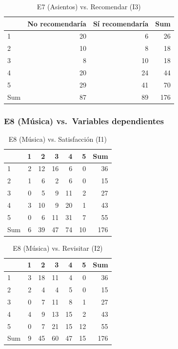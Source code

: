 \documentclass[
  spanish,
]{article}
\begin{document}
\begin{longtable}[t]{lrrr}
\caption{\label{tab:cont-e7-recom}E7 (Asientos) vs. Recomendar (I3)}\\
\toprule
 & No recomendaría & Sí recomendaría & Sum\\
\midrule
1 & 20 & 6 & 26\\
2 & 10 & 8 & 18\\
3 & 8 & 10 & 18\\
4 & 20 & 24 & 44\\
5 & 29 & 41 & 70\\
\addlinespace
Sum & 87 & 89 & 176\\
\bottomrule
\end{longtable}

\subsubsection{E8 (Música) vs.~Variables
dependientes}\label{e8-muxfasica-vs.-variables-dependientes}

\begin{longtable}[t]{lrrrrrr}
\caption{\label{tab:cont-e8-satisf}E8 (Música) vs. Satisfacción (I1)}\\
\toprule
 & 1 & 2 & 3 & 4 & 5 & Sum\\
\midrule
1 & 2 & 12 & 16 & 6 & 0 & 36\\
2 & 1 & 6 & 2 & 6 & 0 & 15\\
3 & 0 & 5 & 9 & 11 & 2 & 27\\
4 & 3 & 10 & 9 & 20 & 1 & 43\\
5 & 0 & 6 & 11 & 31 & 7 & 55\\
\addlinespace
Sum & 6 & 39 & 47 & 74 & 10 & 176\\
\bottomrule
\end{longtable}

\begin{longtable}[t]{lrrrrrr}
\caption{\label{tab:cont-e8-revis}E8 (Música) vs. Revisitar (I2)}\\
\toprule
 & 1 & 2 & 3 & 4 & 5 & Sum\\
\midrule
1 & 3 & 18 & 11 & 4 & 0 & 36\\
2 & 2 & 4 & 4 & 5 & 0 & 15\\
3 & 0 & 7 & 11 & 8 & 1 & 27\\
4 & 4 & 9 & 13 & 15 & 2 & 43\\
5 & 0 & 7 & 21 & 15 & 12 & 55\\
\addlinespace
Sum & 9 & 45 & 60 & 47 & 15 & 176\\
\bottomrule
\end{longtable}
\end{document}
